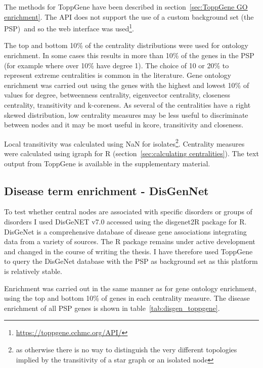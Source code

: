 The methods for ToppGene have been described in section~\ref{sec:ToppGene GO enrichment}. The API does not support the use of a custom background set (the PSP)\, and so the web interface was used\footnote{\url{https://toppgene.cchmc.org/API/}}. 

The top and bottom 10\% of the centrality distributions were used for ontology enrichment. In some cases this results in more  than 10\% of the genes in the PSP (for example where over 10\% have degree 1). The choice of 10 or 20\% to represent extreme centralities is common in the literature\cite{oldham2019consistency}\cite{hsing2008use}. Gene ontology enrichment was carried out using the genes with the  highest and lowest 10\% of values for degree, betweenness centrality, eigenvector centrality, closeness centrality, transitivity and k-coreness. As several of the centralities have a right skewed distribution, low centrality measures may be less useful to discriminate between nodes and it may be most useful  in kcore, transitivity and closeness.

Local transitivity was calculated using NaN for isolates\footnote{as otherwise  there is no way to distinguish the very different topologies implied by the transitivity of a star graph or an isolated node}. Centrality measures were calculated using igraph for R (section~\ref{sec:calculating centralities}). The text output from ToppGene is available in the supplementary material.





\subsection{Disease term enrichment - DisGenNet}


To test whether central nodes are associated with specific disorders or groups of disorders I used DisGeNET v7.0 accessed using the disgenet2R package for R\cite{pinero2020disgenet}. DisGeNet is a comprehensive database of disease gene associations integrating data from a variety of sources\cite{pinero2016disgenet}. The R package remains under active development and changed in the course of writing the thesis. I have therefore used ToppGene to query the DisGeNet database with the PSP as background set as this platform is relatively stable.

Enrichment was carried out in the same manner as for gene ontology enrichment, using the top and bottom 10\% of genes in each centrality measure. The disease enrichment of all PSP genes is shown in table~\ref{tab:disgen_toppgene}.

